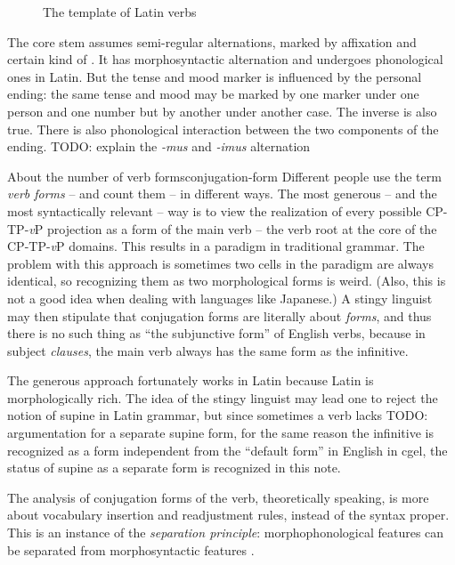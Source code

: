 \documentclass[UTF8, a4paper, oneside]{report}
\newcommand*{\term}[1]{\emph{#1}}
\newcommand{\corpus}[1]{\emph{#1}}
\newcommand{\vP}{\textit{v}P}
\begin{document}
\begin{figure}[H]
    \centering
    
    \caption{The template of Latin verbs}
    \label{fig:latin-verb}
\end{figure}

The core stem assumes semi-regular alternations,
marked by affixation and certain kind of .
It has morphosyntactic alternation 
and undergoes phonological ones in Latin. %
But the tense and mood marker is influenced by the personal ending:
the same tense and mood may be marked by one marker under one person and one number
but by another under another case.
The inverse is also true.
There is also phonological interaction between the two components of the ending.
TODO: explain the \corpus{-mus} and \corpus{-imus} alternation

\begin{theorybox}{About the number of verb forms}{conjugation-form}
    Different people use the term \term{verb forms} -- and count them -- in different ways.
    The most generous -- and the most syntactically relevant -- way 
    is to view the realization of every possible CP-TP-\vP{} projection 
    as a form of the main verb -- the verb root at the core of the CP-TP-\vP{} domains.
    This results in a paradigm in traditional grammar.
    The problem with this approach is sometimes two cells in the paradigm are always identical,
    so recognizing them as two morphological forms is weird.
    (Also, this is not a good idea when dealing with languages like Japanese.)
    A stingy linguist may then stipulate that conjugation forms are literally about \emph{forms},
    and thus there is no such thing as ``the subjunctive form'' of English verbs,
    because in subject \emph{clauses}, 
    the main verb always has the same form as the infinitive.

    The generous approach fortunately works in Latin 
    because Latin is morphologically rich.
    The idea of the stingy linguist may lead one to reject the notion of supine in Latin grammar,
    but since sometimes a verb lacks TODO: argumentation for a separate supine form,
    for the same reason the infinitive is recognized as a form 
    independent from the ``default form'' in English in \acs{cgel},
    the status of supine as a separate form is recognized in this note.

    The analysis of conjugation forms of the verb, theoretically speaking,
    is more about vocabulary insertion and readjustment rules,
    instead of the syntax proper.
    This is an instance of the \emph{separation principle}:
    morphophonological features can be separated from morphosyntactic features
    \citep{embick2000features}.
\end{theorybox}
\end{document}
